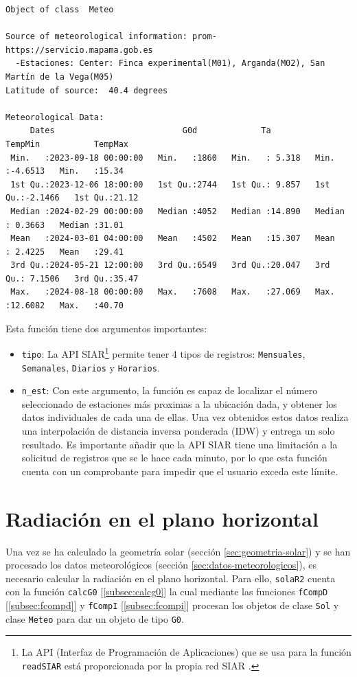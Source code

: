 \begin{verbatim}
Object of class  Meteo 

Source of meteorological information: prom-https://servicio.mapama.gob.es 
  -Estaciones: Center: Finca experimental(M01), Arganda(M02), San Martín de la Vega(M05) 
Latitude of source:  40.4 degrees

Meteorological Data:
     Dates                          G0d             Ta            TempMin           TempMax     
 Min.   :2023-09-18 00:00:00   Min.   :1860   Min.   : 5.318   Min.   :-4.6513   Min.   :15.34  
 1st Qu.:2023-12-06 18:00:00   1st Qu.:2744   1st Qu.: 9.857   1st Qu.:-2.1466   1st Qu.:21.12  
 Median :2024-02-29 00:00:00   Median :4052   Median :14.890   Median : 0.3663   Median :31.01  
 Mean   :2024-03-01 04:00:00   Mean   :4502   Mean   :15.307   Mean   : 2.4225   Mean   :29.41  
 3rd Qu.:2024-05-21 12:00:00   3rd Qu.:6549   3rd Qu.:20.047   3rd Qu.: 7.1506   3rd Qu.:35.47  
 Max.   :2024-08-18 00:00:00   Max.   :7608   Max.   :27.069   Max.   :12.6082   Max.   :40.70
\end{verbatim}

Esta función tiene dos argumentos importantes:
\begin{itemize}
\item \texttt{tipo}: La API SIAR\footnote{La API (Interfaz de Programación de Aplicaciones) que se usa para la función \texttt{readSIAR} está proporcionada por la propia red SIAR \cite{siar23}.} permite tener 4 tipos de registros: \texttt{Mensuales}, \texttt{Semanales}, \texttt{Diarios} y \texttt{Horarios}.
\item \texttt{n\_est}: Con este argumento, la función es capaz de localizar el número seleccionado de estaciones más proximas a la ubicación dada, y obtener los datos individuales de cada una de ellas. Una vez obtenidos estos datos realiza una interpolación de distancia inversa ponderada (IDW) y entrega un solo resultado. Es importante añadir que la API SIAR tiene una limitación a la solicitud de registros que se le hace cada minuto, por lo que esta función cuenta con un comprobante para impedir que el usuario exceda este límite.
\end{itemize}

\section{Radiación en el plano horizontal}
\label{sec:org9f02109}
\label{sec:radiacion-plano-horizontal}
Una vez se ha calculado la geometría solar (sección \ref{sec:geometria-solar}) y se han procesado los datos meteorológicos (sección \ref{sec:datos-meteorologicos}), es necesario calcular la radiación en el plano horizontal. Para ello, \texttt{solaR2} cuenta con la función \texttt{calcG0} [\ref{subsec:calcg0}] la cual mediante las funciones \texttt{fCompD} [\ref{subsec:fcompd}] y \texttt{fCompI} [\ref{subsec:fcompi}] procesan los objetos de clase \texttt{Sol} y clase \texttt{Meteo} para dar un objeto de tipo \texttt{G0}.

